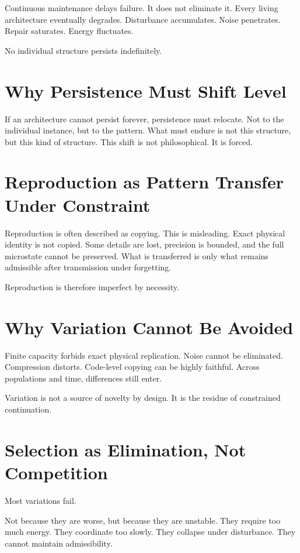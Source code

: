 \documentclass[11pt,twoside,openright]{book}
\begin{document}
Continuous maintenance delays failure. It does not eliminate it. Every living architecture eventually degrades. Disturbance accumulates. Noise penetrates. Repair saturates. Energy fluctuates.

No individual structure persists indefinitely.

\section*{Why Persistence Must Shift Level}

If an architecture cannot persist forever, persistence must relocate. Not to the individual instance, but to the pattern. What must endure is not this structure, but this kind of structure. This shift is not philosophical. It is forced.

\section*{Reproduction as Pattern Transfer Under Constraint}

Reproduction is often described as copying. This is misleading. Exact physical identity is not copied. Some details are lost, precision is bounded, and the full microstate cannot be preserved. What is transferred is only what remains admissible after transmission under forgetting.

Reproduction is therefore imperfect by necessity.

\section*{Why Variation Cannot Be Avoided}

Finite capacity forbids exact physical replication. Noise cannot be eliminated. Compression distorts. Code-level copying can be highly faithful. Across populations and time, differences still enter.

Variation is not a source of novelty by design. It is the residue of constrained continuation.

\section*{Selection as Elimination, Not Competition}

Most variations fail.

Not because they are worse, but because they are unstable. They require too much energy. They coordinate too slowly. They collapse under disturbance. They cannot maintain admissibility.
\end{document}
